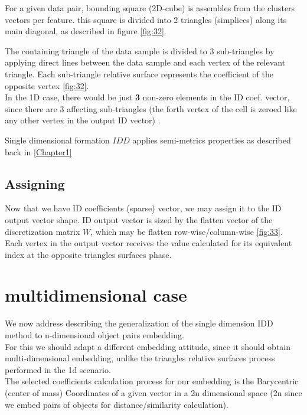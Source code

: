 		
		
		
		
		

		For a given data pair, bounding square (2D-cube) is assembles from the clusters vectors per feature.
		this square is divided into 2 triangles (simplices) along its main diagonal, as described in figure \ref{fig:32}.
		
		The containing triangle of the data sample is divided to 3 sub-triangles by applying direct lines between the data sample and each vertex of the relevant triangle. Each sub-triangle relative surface represents the coefficient of the opposite vertex \ref{fig:32}. \\ 
		In the 1D case, there would be just \textbf{3} non-zero elements in the ID coef. vector, since there are 3 affecting sub-triangles (the forth vertex of the cell is zeroed like any other vertex in the output ID vector) .
				
		Single dimensional formation $IDD$ applies semi-metrics properties as described back in \ref{Chapter1}
		
			
	\subsection{Assigning}
	Now that we have ID coefficients (sparse) vector, we may assign it to the ID output vector shape.
	ID output vector is sized by the flatten vector of the discretization matrix $W$, which may be flatten row-wise/column-wise \ref{fig:33}.\\
	Each vertex in the output vector receives the value calculated for its equivalent index at the opposite triangles surfaces phase.
	


\section{multidimensional case}

We now address describing the generalization of the single dimension IDD method to n-dimensional object pairs embedding. \\
For this we should adapt a different embedding attitude, since it should obtain multi-dimensional embedding, unlike the triangles relative surfaces process performed in the 1d scenario.  \\
The selected coefficients calculation process for our embedding is the Barycentric (center of mass) Coordinates \cite{bcc} of a given vector in a 2n dimensional space (2n since we embed pairs of objects for distance/similarity calculation).

